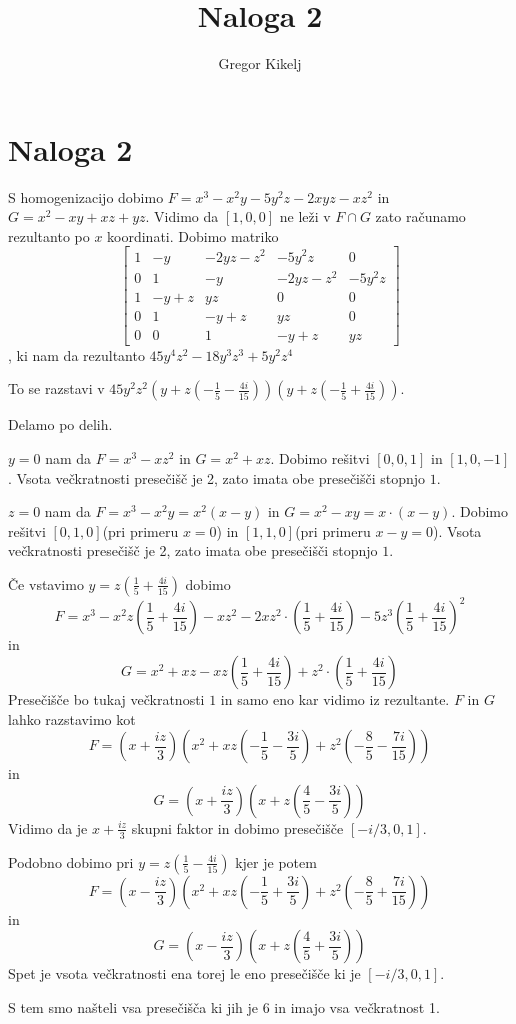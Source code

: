 \documentclass[12pt]{article}
\title{Naloga 2}
\author{Gregor Kikelj}
\begin{document}
\section{Naloga 2}
S homogenizacijo dobimo $F=x^3-x^2y-5y^2z-2xyz-xz^2$ in $G=x^2-xy+xz+yz$. Vidimo da $[1, 0, 0]$ ne leži v $F\cap G$ zato računamo rezultanto po $x$ koordinati. 
Dobimo matriko \[\left[\begin{matrix}1 & - y & - 2 y z - z^{2} & - 5 y^{2} z & 0\\0 & 1 & - y & - 2 y z - z^{2} & - 5 y^{2} z\\1 & - y + z & y z & 0 & 0\\0 & 1 & - y + z & y z & 0\\0 & 0 & 1 & - y + z & y z\end{matrix}\right]\],
ki nam da rezultanto $45 y^{4} z^{2} - 18 y^{3} z^{3} + 5 y^{2} z^{4}$ 

To se razstavi v
$45 y^{2} z^{2} \left(y + z \left(- \frac{1}{5} - \frac{4 i}{15}\right)\right) \left(y + z \left(- \frac{1}{5} + \frac{4 i}{15}\right)\right)$.

Delamo po delih.


$y=0$ nam da $F=x^3-xz^2$ in $G=x^2+xz$. Dobimo rešitvi $[0, 0, 1]$ in $[1, 0, -1]$. Vsota večkratnosti presečišč je 2, zato imata obe presečišči stopnjo $1$. 

$z=0$ nam da $F=x^3-x^2y=x^2(x-y)$ in $G=x^2-xy=x\cdot (x-y)$. Dobimo rešitvi $[0, 1, 0]$(pri primeru $x=0$) in $[1, 1, 0]$(pri primeru $x-y=0$). Vsota večkratnosti presečišč je 2, zato imata obe presečišči stopnjo $1$.

Če vstavimo $y=z(\frac{1}{5} +\frac{4i}{15} )$ dobimo \[F=x^{3} - x^{2} z \left(\frac{1}{5} + \frac{4 i}{15}\right) - x z^{2} - 2 x z^{2} \cdot \left(\frac{1}{5} + \frac{4 i}{15}\right) - 5 z^{3} \left(\frac{1}{5} + \frac{4 i}{15}\right)^{2}\]
in \[G=x^{2} + x z - x z \left(\frac{1}{5} + \frac{4 i}{15}\right) + z^{2} \cdot \left(\frac{1}{5} + \frac{4 i}{15}\right)\]
Presečišče bo tukaj večkratnosti $1$ in samo eno kar vidimo iz rezultante. $F$ in $G$ lahko razstavimo kot
\[F=\left(x + \frac{i z}{3}\right) \left(x^{2} + x z \left(- \frac{1}{5} - \frac{3 i}{5}\right) + z^{2} \left(- \frac{8}{5} - \frac{7 i}{15}\right)\right)\]
in
\[G=\left(x + \frac{i z}{3}\right) \left(x + z \left(\frac{4}{5} - \frac{3 i}{5}\right)\right)\]
Vidimo da je $x+\frac{iz}{3}$ skupni faktor in dobimo presečišče $[-i/3, 0, 1]$.

Podobno dobimo pri $y=z(\frac{1}{5} -\frac{4i}{15} )$ kjer je potem 
\[F=\left(x - \frac{i z}{3}\right) \left(x^{2} + x z \left(- \frac{1}{5} + \frac{3 i}{5}\right) + z^{2} \left(- \frac{8}{5} + \frac{7 i}{15}\right)\right)\]
in
\[G=\left(x - \frac{i z}{3}\right) \left(x + z \left(\frac{4}{5} + \frac{3 i}{5}\right)\right)\]
Spet je vsota večkratnosti ena torej le eno presečišče ki je $[-i/3, 0, 1]$.

S tem smo našteli vsa presečišča ki jih je 6 in imajo vsa večkratnost 1.
\end{document}
